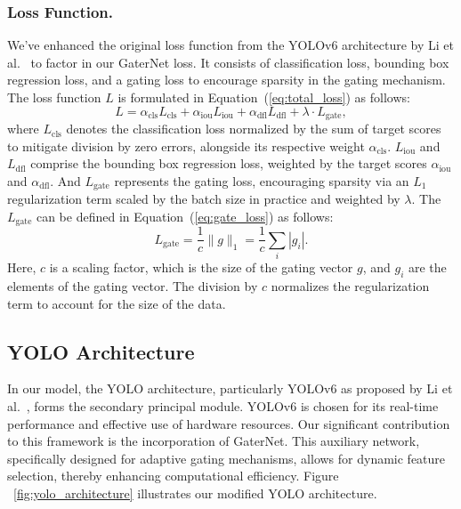 \documentclass[runningheads]{llncs}
\begin{document}
\subsubsection*{Loss Function.} We’ve enhanced the original loss function from the YOLOv6 architecture by Li et al.~\cite{li2023yolov6,li2022yolov6} to factor in our GaterNet loss. It consists of classification loss, bounding box regression loss, and a gating loss to encourage sparsity in the gating mechanism. The loss function \( L \) is formulated in Equation~(\ref{eq:total_loss}) as follows:\begin{equation}
L = \alpha_{\text{cls}} L_{\text{cls}} + \alpha_{\text{iou}} L_{\text{iou}} + \alpha_{\text{dfl}} L_{\text{dfl}} + \lambda \cdot L_{\text{gate}}, \label{eq:total_loss}
\end{equation} where \( L_{\text{cls}} \) denotes the classification loss normalized by the sum of target scores to mitigate division by zero errors, alongside its respective weight \( \alpha_{\text{cls}} \). \( L_{\text{iou}} \) and \( L_{\text{dfl}} \) comprise the bounding box regression loss, weighted by the target scores \( \alpha_{\text{iou}} \) and \( \alpha_{\text{dfl}} \). And \( L_{\text{gate}} \) represents the gating loss, encouraging sparsity via an \( L_1 \) regularization term scaled by the batch size in practice and weighted by \( \lambda \). The \( L_{\text{gate}} \) can be defined in Equation~(\ref{eq:gate_loss}) as follows:
\begin{equation}
L_{\text{gate}} = \frac{1}{c} \| g \|_1 = \frac{1}{c} \sum_{i} | g_i |.  \label{eq:gate_loss}
\end{equation}
Here, \( c \) is a scaling factor, which is the size of the gating vector \( g \), and \( g_i \) are the elements of the gating vector. The division by \( c \) normalizes the regularization term to account for the size of the data.

\subsection{YOLO Architecture}

In our model, the YOLO architecture, particularly YOLOv6 as proposed by Li et al.~\cite{li2023yolov6,li2022yolov6}, forms the secondary principal module. YOLOv6 is chosen for its real-time performance and effective use of hardware resources. Our significant contribution to this framework is the incorporation of GaterNet. This auxiliary network, specifically designed for adaptive gating mechanisms, allows for dynamic feature selection, thereby enhancing computational efficiency. Figure ~\ref{fig:yolo_architecture} illustrates our modified YOLO architecture.
\end{document}
